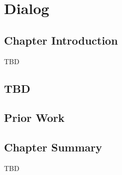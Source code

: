 \chapter{Dialog}
\label{ch:dialog}


\section{Chapter Introduction}

TBD 

\section{TBD}

\section{Prior Work}

\section{Chapter Summary}

TBD